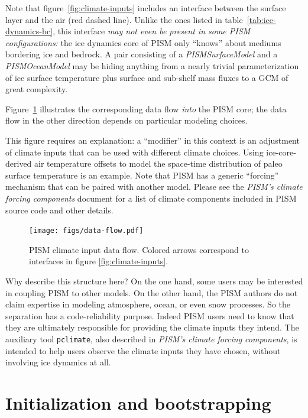 \documentclass[titlepage,letterpaper,final]{scrartcl}
\begin{document}
Note that figure~\ref{fig:climate-inputs} includes an interface between the surface layer and the air (red dashed line).
Unlike the ones listed in table~\ref{tab:ice-dynamics-bc}, this interface
\emph{may not even be present in some PISM configurations:} the ice dynamics
core of PISM only ``knows'' about mediums bordering ice and bedrock. A pair
consisting of a \emph{PISMSurfaceModel} and a \emph{PISMOceanModel} may be
hiding anything from a nearly trivial parameterization of ice surface
temperature plus surface and sub-shelf mass fluxes to a GCM of great
complexity.

Figure~\ref{fig:climate-input-data-flow} illustrates the corresponding data
flow \emph{into} the PISM core; the data flow in the other direction depends on
particular modeling choices.

This figure requires an explanation: a ``modifier'' in this context is an
adjustment of climate inputs that can be used with different climate
choices.  Using ice-core-derived air temperature offsets to model the
space-time distribution of paleo surface temperature is an example.  Note that
PISM has a generic ``forcing'' mechanism that can be paired with another model.
Please see the \emph{PISM's climate forcing components} document for
a list of climate components included in PISM source code and other details.

\begin{figure}
  \centering
  \texttt{[image: figs/data-flow.pdf]}
  \caption{PISM climate input data flow. Colored arrows correspond to interfaces in
    figure \ref{fig:climate-inputs}.}
  \label{fig:climate-input-data-flow}
\end{figure}

Why describe this structure here? On the one hand, some users may be interested
in coupling PISM to other models. On the other hand, the PISM authors do not
claim expertise in modeling atmosphere, ocean, or even snow processes.   So the
separation has a code-reliability purpose. Indeed PISM users need to know that
they are ultimately responsible for providing the climate inputs they intend.
The auxiliary tool \texttt{pclimate}, also described in \emph{PISM's climate
  forcing components}, is intended to help users observe the climate inputs
they have chosen, without involving ice dynamics at all.


\clearpage
\newpage
\section{Initialization and bootstrapping}
\label{sec:boot}
\end{document}
